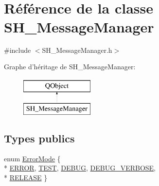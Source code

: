\hypertarget{classSH__MessageManager}{\section{Référence de la classe S\-H\-\_\-\-Message\-Manager}
\label{classSH__MessageManager}
}


{\ttfamily \#include $<$S\-H\-\_\-\-Message\-Manager.\-h$>$}

Graphe d'héritage de S\-H\-\_\-\-Message\-Manager\-:\begin{figure}[H]
\begin{center}
\leavevmode
\includegraphics[height=2.000000cm]{classSH__MessageManager}
\end{center}
\end{figure}
\subsection*{Types publics}
\begin{DoxyCompactItemize}
\item 
enum \hyperlink{classSH__MessageManager_a13742daa1342475d4fcee295b9dee4ee}{Error\-Mode} \{ \\*
\hyperlink{classSH__MessageManager_a13742daa1342475d4fcee295b9dee4eeaed8e377759e5f203a417dbd267cbc33a}{E\-R\-R\-O\-R}, 
\hyperlink{classSH__MessageManager_a13742daa1342475d4fcee295b9dee4eea20e4a860505461ef78ebb902cac1bbc7}{T\-E\-S\-T}, 
\hyperlink{classSH__MessageManager_a13742daa1342475d4fcee295b9dee4eeac1f651f46ed4faeccbb6ce75f31c6123}{D\-E\-B\-U\-G}, 
\hyperlink{classSH__MessageManager_a13742daa1342475d4fcee295b9dee4eea10b19d57d9a8572101d39b51cdca79d0}{D\-E\-B\-U\-G\-\_\-\-V\-E\-R\-B\-O\-S\-E}, 
\\*
\hyperlink{classSH__MessageManager_a13742daa1342475d4fcee295b9dee4eea81df11b9abe47d3c95d300a3ff71227e}{R\-E\-L\-E\-A\-S\-E}
 \}
\end{DoxyCompactItemize}
